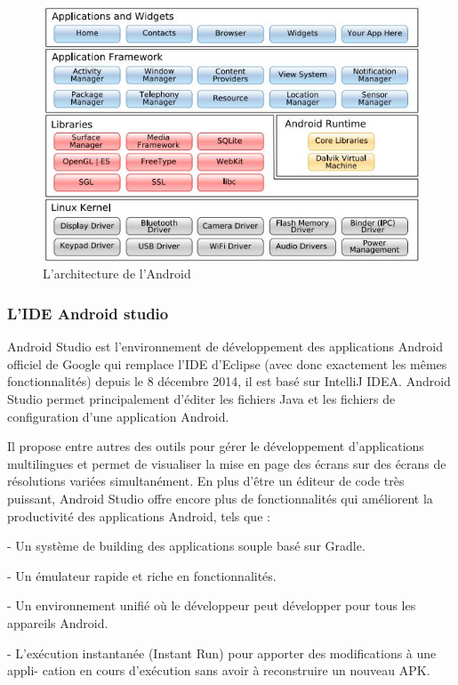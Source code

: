\begin{figure}[H]
\begin{center}
\includegraphics[width=1\linewidth]{images/architecture_android}
\end{center}
\caption{L'architecture de l'Android}
\label{fig:1}
\end{figure}

\subsubsection{L’IDE Android studio}


Android Studio est l’environnement de développement des applications Android officiel de Google qui remplace l’IDE d’Eclipse (avec donc exactement les mêmes fonctionnalités) depuis le 8 décembre 2014, il est basé sur  IntelliJ IDEA. 
Android Studio permet principalement d'éditer les fichiers Java et les fichiers de configuration d'une application Android.

Il propose entre autres des outils pour gérer le développement d'applications multilingues et permet de visualiser la mise en page des écrans sur des écrans de résolutions variées simultanément.
En plus d’être un éditeur de code très puissant, Android Studio offre encore plus de fonctionnalités qui améliorent la productivité des applications Android, tels que :

- Un système de building des applications souple basé sur Gradle.

- Un émulateur rapide et riche en fonctionnalités.

- Un environnement unifié où le développeur peut développer pour tous les appareils
Android.

- L’exécution instantanée (Instant Run) pour apporter des modifications à une appli-
cation en cours d’exécution sans avoir à reconstruire un nouveau APK.

